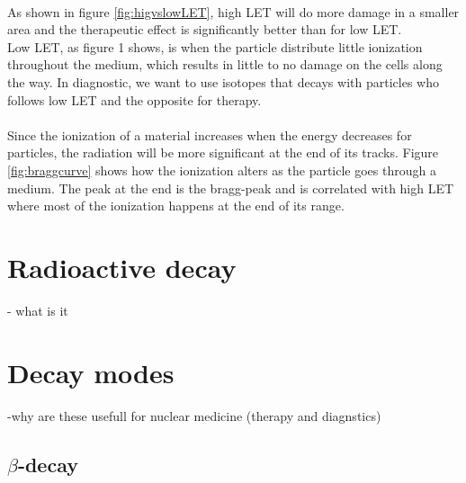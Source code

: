 \documentclass[twoside,english]{uiofysmaster/uiofysmaster}
\begin{document}
\\
As shown in figure \ref{fig:higvslowLET}, high LET will do more damage in a smaller area and the therapeutic effect is significantly better than for low LET. \\
Low LET, as figure 1 shows, is when the particle distribute little ionization throughout the medium, which results in little to no damage on the cells along the way. In diagnostic, we want to use isotopes that decays with particles who follows low LET and the opposite for therapy.\\
\\
Since the ionization of a material increases when the energy decreases for particles\cite{Nuclear_medicine}, the radiation will be more significant at the end of its tracks. Figure \ref{fig:braggcurve} shows how the ionization alters as the particle goes through a medium. The peak at the end is the bragg-peak and is correlated with high LET where most of the ionization happens at the end of its range. 




\section{Radioactive decay}
\label{sec:Radioactivedecay}

- what is it
 
\section{Decay modes}
\label{sec:decaymodes}

-why are these usefull for nuclear medicine (therapy and diagnstics)


\subsection{$\beta$-decay}
\end{document}
